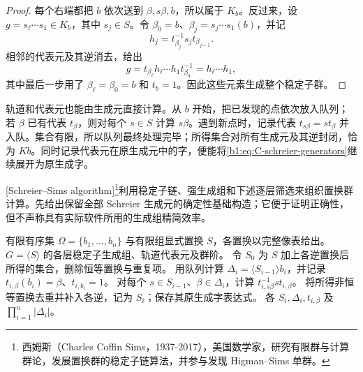 \begin{proof}
	每个右端都把 \(b\) 依次送到 \(\beta,s\beta,b\)，所以属于 \(K_b\)。反过来，设 \(g=s_\ell\cdots s_1\in K_b\)，其中 \(s_j\in S\)。令 \(\beta_0=b\)、\(\beta_j=s_j\cdots s_1(b)\)，并记
	\[
		h_j=t_{\beta_j}^{-1}s_jt_{\beta_{j-1}}.
	\]
	相邻的代表元及其逆消去，给出
	\[
		g=t_{\beta_\ell}h_\ell\cdots h_1t_{\beta_0}^{-1}=h_\ell\cdots h_1,
	\]
	其中最后一步用了 \(\beta_\ell=\beta_0=b\) 和 \(t_b=1\)。因此这些元素生成整个稳定子群。
\end{proof}

轨道和代表元也能由生成元直接计算。从 \(b\) 开始，把已发现的点依次放入队列；若 \(\beta\) 已有代表 \(t_\beta\)，则对每个 \(s\in S\) 计算 \(s\beta\)。遇到新点时，记录代表 \(t_{s\beta}=s t_\beta\) 并入队。集合有限，所以队列最终处理完毕；所得集合对所有生成元及其逆封闭，恰为 \(Kb\)。同时记录代表元在原生成元中的字，便能将\eqref{b1:eq:C-schreier-generators}继续展开为原生成字。

\ProseParagraphBreak
{}[Schreier--Sims algorithm]\footnote{西姆斯（Charles Coffin Sims，1937-2017），美国数学家，研究有限群与计算群论，发展置换群的稳定子链算法，并参与发现 Higman--Sims 单群。}利用稳定子链、强生成组和下述逐层筛选来组织置换群计算。先给出保留全部 Schreier 生成元的确定性基础构造；它便于证明正确性，但不声称具有实际软件所用的生成组精简效率。

\begin{algorithm}[htbp]
	\caption{稳定子链的 Schreier 构造}
	\label{b1:alg:C-stabilizer-chain}
	\begin{algorithmsteps}{有限有序集 \(\Omega=\{b_1,\ldots,b_n\}\) 与有限组显式置换 \(S\)，各置换以完整像表给出。}{\(G=\langle S\rangle\) 的各层稳定子生成组、轨道代表元及群阶。}
		\State 令 \(S_0\) 为 \(S\) 加上各逆置换后所得的集合，删除恒等置换与重复项。
			\State 用队列计算 \(\Delta_i=\langle S_{i-1}\rangle b_i\)，并记录 \(t_{i,\beta}(b_i)=\beta\)、\(t_{i,b_i}=1\)。
			\State 对每个 \(s\in S_{i-1}\)、\(\beta\in\Delta_i\)，计算 \(t_{i,s\beta}^{-1}s t_{i,\beta}\)。
			\State 将所得非恒等置换去重并补入各逆，记为 \(S_i\)；保存其原生成字表达式。
		\EndFor
		\State \Return 各 \(S_i,\Delta_i,t_{i,\beta}\) 及 \(\prod_{i=1}^n|\Delta_i|\)。
	\end{algorithmsteps}
\end{algorithm}

